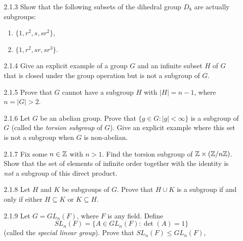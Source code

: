 \begin{enumerate}
   \item[2.1.3]   Show that the following subsets of the dihedral group $D_8$
                  are actually subgroups:
                  \begin{enumerate}
                     \item $\{1, r^2, s, sr^2\}$,
                     \item $\{1, r^2, sr, sr^3\}$.
                  \end{enumerate}
   \item[2.1.4]   Give an explicit example of a group $G$ and an infinite subset
                  $H$ of $G$ that is closed under the group operation but is not
                  a subgroup of $G$.
   \item[2.1.5]   Prove that $G$ cannot have a subgroup $H$ with $|H| = n - 1$,
                  where $n = |G| > 2$.
   \item[2.1.6]   Let $G$ be an abelian group. Prove that
                  $\{g \in G : |g| < \infty\}$ is a subgroup of $G$ (called the
                  \textit{torsion subgroup} of $G$). Give an explicit example
                  where this set is not a subgroup when $G$ is non-abelian.
   \item[2.1.7]   Fix some $n \in \mathbb{Z}$ with $n > 1$. Find the torsion subgroup
                  of $\mathbb{Z} \times (\mathbb{Z}/n\mathbb{Z})$. Show that the set of elements of
                  infinite order together with the identity is \textit{not} a
                  subgroup of this direct product.
   \item[2.1.8]   Let $H$ and $K$ be subgroups of $G$. Prove that $H \cup K$ is
                  a subgroup if and only if either $H \subseteq K$ or
                  $K \subseteq H$.
   \item[2.1.9]   Let $G = GL_n(F)$, where $F$ is any field. Define
                  $$SL_n(F) = \{A \in GL_n(F) : \det(A) = 1\}$$
                  (called the \textit{special linear group}). Prove that
                  $SL_n(F) \le GL_n(F)$,

\end{enumerate}
